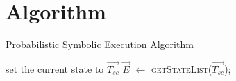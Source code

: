 \section{Algorithm}
\label{sec:algorithm}


\begin{algorithm}
	\caption{Probabilistic Symbolic Execution Algorithm}
	\label{alg:symb_ex}
	\SetAlgoLined
	\small
	set the current state to $\vec{T_{sc}}$\;
	$\vec{E}$ $\gets$ \textsc{getStateList($\vec{T_{sc}}$)}; \\
\end{algorithm}